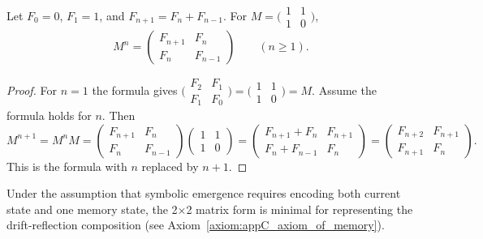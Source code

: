 \begin{lemma}
\label{lemma:appC_fibonacci_structure_matrix_powers}
Let $F_0=0$, $F_1=1$, and $F_{n+1}=F_n+F_{n-1}$. For
$M=\bigl(\begin{smallmatrix}1&1\\1&0\end{smallmatrix}\bigr)$,
\[
M^n=\begin{pmatrix}F_{n+1}&F_n\\F_n&F_{n-1}\end{pmatrix}\qquad(n\ge1).
\]
\end{lemma}

\begin{proof}
\label{proof:appC_fibonacci_matrix_powers}
For $n=1$ the formula gives
$\bigl(\begin{smallmatrix}F_2&F_1\\F_1&F_0\end{smallmatrix}\bigr)
=\bigl(\begin{smallmatrix}1&1\\1&0\end{smallmatrix}\bigr)=M$. Assume the formula
holds for $n$. Then
\[
M^{n+1}=M^nM
=\begin{pmatrix}F_{n+1}&F_n\\F_n&F_{n-1}\end{pmatrix}
 \begin{pmatrix}1&1\\1&0\end{pmatrix}
=\begin{pmatrix}F_{n+1}+F_n&F_{n+1}\\F_n+F_{n-1}&F_n\end{pmatrix}
=\begin{pmatrix}F_{n+2}&F_{n+1}\\F_{n+1}&F_n\end{pmatrix}.
\]
This is the formula with $n$ replaced by $n+1$.
\end{proof}

\begin{proposition}
\label{proposition:appC_conditional_minimality_2x2}
Under the assumption that symbolic emergence requires encoding both current state
and one memory state, the 2×2 matrix form is minimal for representing the
drift-reflection composition (see Axiom~\ref{axiom:appC_axiom_of_memory}).
\end{proposition}


